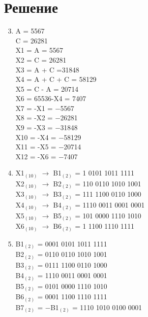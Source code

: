 \documentclass[11pt]{article}
\begin{document}
\pagebreak{}
\section{Решение}
\begin{paracol}{2}
\begin{enumerate}
\setcounter{enumi}{2}
	\item
		A = 5567\\
		C = 26281\\
		X1 =  A = 5567\\
		X2 = C = 26281\\
		X3 = A + C =31848\\
		X4 = A + C + C = 58129\\
		X5 = C - A = 20714\\
		X6 = 65536-X4 = 7407\\
		X7 = -X1 = $-$5567\\
		X8 = -X2 = $-$26281\\
		X9 = -X3 = $-$31848\\
		X10 = -X4 = $-$58129\\
		X11 = -X5 = $-$20714\\
		X12 = -X6 = $-$7407
	\item 
		X1$_{(10)}$ $\rightarrow$ B1$_{(2)}$ = \phantom{000}1 0101 1011 1111\\
		X2$_{(10)}$ $\rightarrow$ B2$_{(2)}$ = \phantom{0}110 0110 1010 1001\\
		X3$_{(10)}$ $\rightarrow$ B3$_{(2)}$ = \phantom{0}111 1100 0110 1000\\
		X4$_{(10)}$ $\rightarrow$ B4$_{(2)}$ = 1110 0011 0001 0001\\
		X5$_{(10)}$ $\rightarrow$ B5$_{(2)}$ =  \phantom{0}101 0000 1110 1010\\
		X6$_{(10)}$ $\rightarrow$ B6$_{(2)}$ = \phantom{000}1 1100 1110 1111
	\item
		B1$_{(2)}$ = 0001 0101 1011 1111\\
		B2$_{(2)}$ = 0110 0110 1010 1001\\
		B3$_{(2)}$ = 0111 1100 0110 1000\\
		B4$_{(2)}$ = 1110 0011 0001 0001\\
		B5$_{(2)}$ = 0101 0000 1110 1010\\
		B6$_{(2)}$ = 0001 1100 1110 1111\\
		B7$_{(2)}$ \phantom{0}= $-$B1$_{(2)}$ = 1110 1010 0100 0001\\

\end{enumerate}
\end{paracol}
\end{document}
